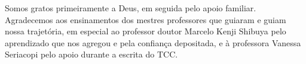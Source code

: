 \begin{agradecimentos}
Somos gratos primeiramente a Deus, em seguida pelo apoio familiar. Agradecemos aos ensinamentos dos mestres professores que guiaram e guiam nossa trajetória, em especial ao professor doutor Marcelo Kenji Shibuya pelo aprendizado que nos agregou e pela confiança depositada, e à professora Vanessa Seriacopi pelo apoio durante a escrita do TCC. 
\end{agradecimentos}